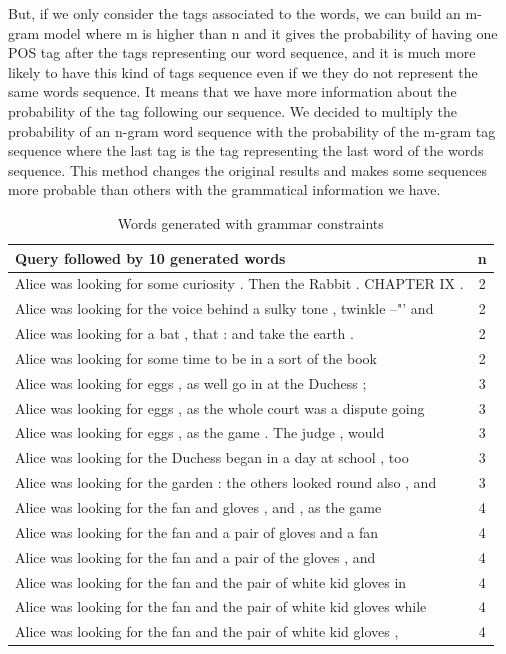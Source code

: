 \documentclass[a4paper,12pt]{article}
\begin{document}
But, if we only consider the tags associated to the words, we can build an m-gram model where m is higher than n and it gives the probability of having one POS tag after the tags representing our word sequence, and it is much more likely to have this kind of tags sequence even if we they do not represent the same words sequence. It means that we have more information about the probability of the tag following our sequence. We decided to multiply the probability of an n-gram word sequence with the probability of the m-gram tag sequence where the last tag is the tag representing the last word of the words sequence. This method changes the original results and makes some sequences more probable than others with the grammatical information we have.

\begin{table}[]
\centering
\caption{Words generated with grammar constraints}
\label{grammarsent}
\begin{tabular}{| l |c|}
\hline
Query followed by 10 generated words                                   & n \\ \hline
Alice was looking for some curiosity . Then the Rabbit . CHAPTER IX .  & 2 \\ \hline
Alice was looking for the voice behind a sulky tone , twinkle --"' and & 2 \\ \hline
Alice was looking for a bat , that : and take the earth .              & 2 \\ \hline
Alice was looking for some time to be in a sort of the book            & 2 \\ \hline
Alice was looking for eggs , as well go in at the Duchess ;            & 3 \\ \hline
Alice was looking for eggs , as the whole court was a dispute going    & 3 \\ \hline
Alice was looking for eggs , as the game . The judge , would           & 3 \\ \hline
Alice was looking for the Duchess began in a day at school , too       & 3 \\ \hline
Alice was looking for the garden : the others looked round also , and  & 3 \\ \hline
Alice was looking for the fan and gloves , and , as the game           & 4 \\ \hline
Alice was looking for the fan and a pair of gloves and a fan           & 4 \\ \hline
Alice was looking for the fan and a pair of the gloves , and           & 4 \\ \hline
Alice was looking for the fan and the pair of white kid gloves in      & 4 \\ \hline
Alice was looking for the fan and the pair of white kid gloves while   & 4 \\ \hline
Alice was looking for the fan and the pair of white kid gloves ,       & 4 \\ \hline
\end{tabular}
\end{table}
\end{document}
